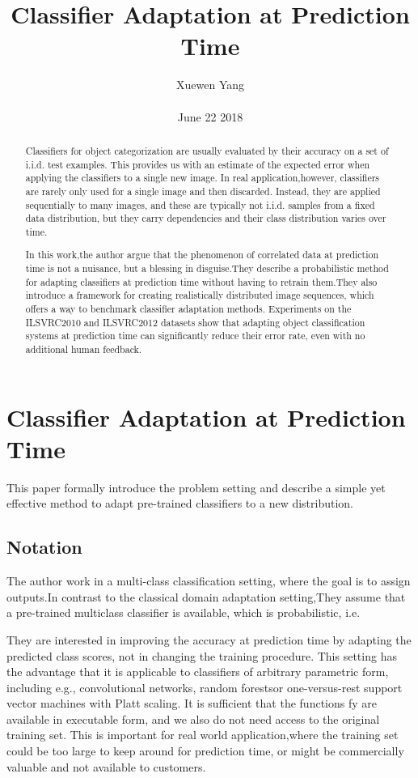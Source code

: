 \documentclass[10pt,twocolumn,letterpaper]{article}
\author{Xuewen Yang\\\\
June 22 2018}
\title{Classifier Adaptation at Prediction Time}
\begin{document}
\maketitle
\begin{abstract}
Classifiers for object categorization are usually evaluated by their accuracy on a set of i.i.d. test examples. This provides us with an estimate of the expected error when applying the classifiers to a single new image. In real application,however, classifiers are rarely only used for a single
image and then discarded. Instead, they are applied sequentially to many images, and these are typically not i.i.d. samples from a fixed data distribution, but they carry dependencies and their class distribution varies over time.

In this work,the author argue that the phenomenon of correlated data at prediction time is not a nuisance, but a blessing in disguise.They describe a probabilistic method for adapting classifiers at prediction time without having to retrain them.They also introduce a framework for creating realistically distributed image sequences, which offers a way to benchmark classifier adaptation methods. Experiments on the ILSVRC2010 and ILSVRC2012 datasets show that adapting object classification systems at prediction time can significantly reduce their error rate, even with no additional human feedback.
\end{abstract}
\section{Classifier Adaptation at Prediction Time}
This paper formally introduce the problem setting and describe a simple yet effective method to adapt pre-trained classifiers to a new distribution.
\subsection{Notation}
The author work in a multi-class classification setting, where the goal is to assign outputs.In contrast to the classical domain adaptation setting,They assume that a pre-trained multiclass classifier is available, which is probabilistic, i.e.

They are interested in improving the accuracy at prediction time by adapting the predicted class scores, not in changing the training procedure. This setting has the advantage that it is applicable to classifiers of arbitrary parametric form, including e.g., convolutional networks\cite{Bengio2009Learning}, random forests\cite{Criminisi2012Decision}or one-versus-rest support vector machines\cite{Lampert2009Kernel} with Platt scaling. It is sufficient that the functions fy are available in executable form, and we also do not need access to the original training set. This is important for real world application,where the training set could be too large to keep around for prediction time, or might be commercially valuable and not available to customers.
\end{document}
